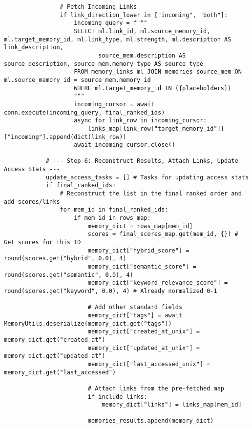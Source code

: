 \documentclass[12pt,a4paper]{article}
\begin{document}
\begin{pageablecode}
\begin{verbatim}
                # Fetch Incoming Links
                if link_direction_lower in ["incoming", "both"]:
                    incoming_query = f"""
                    SELECT ml.link_id, ml.source_memory_id, ml.target_memory_id, ml.link_type, ml.strength, ml.description AS link_description,
                           source_mem.description AS source_description, source_mem.memory_type AS source_type
                    FROM memory_links ml JOIN memories source_mem ON ml.source_memory_id = source_mem.memory_id
                    WHERE ml.target_memory_id IN ({placeholders})
                    """
                    incoming_cursor = await conn.execute(incoming_query, final_ranked_ids)
                    async for link_row in incoming_cursor:
                        links_map[link_row["target_memory_id"]]["incoming"].append(dict(link_row))
                    await incoming_cursor.close()

            # --- Step 6: Reconstruct Results, Attach Links, Update Access Stats ---
            update_access_tasks = [] # Tasks for updating access stats
            if final_ranked_ids:
                # Reconstruct the list in the final ranked order and add scores/links
                for mem_id in final_ranked_ids:
                    if mem_id in rows_map:
                        memory_dict = rows_map[mem_id]
                        scores = final_scores_map.get(mem_id, {}) # Get scores for this ID
                        memory_dict["hybrid_score"] = round(scores.get("hybrid", 0.0), 4)
                        memory_dict["semantic_score"] = round(scores.get("semantic", 0.0), 4)
                        memory_dict["keyword_relevance_score"] = round(scores.get("keyword", 0.0), 4) # Already normalized 0-1

                        # Add other standard fields
                        memory_dict["tags"] = await MemoryUtils.deserialize(memory_dict.get("tags"))
                        memory_dict["created_at_unix"] = memory_dict.get("created_at")
                        memory_dict["updated_at_unix"] = memory_dict.get("updated_at")
                        memory_dict["last_accessed_unix"] = memory_dict.get("last_accessed")

                        # Attach links from the pre-fetched map
                        if include_links:
                            memory_dict["links"] = links_map[mem_id]

                        memories_results.append(memory_dict)


\end{verbatim}
\end{pageablecode}
\end{document}
